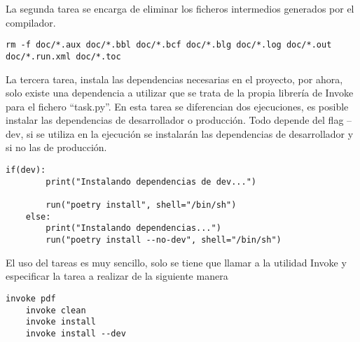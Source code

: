 La segunda tarea se encarga de eliminar los ficheros intermedios generados por el compilador.
\begin{lstlisting}[style=consola]
	rm -f doc/*.aux doc/*.bbl doc/*.bcf doc/*.blg doc/*.log doc/*.out doc/*.run.xml doc/*.toc
\end{lstlisting}

La tercera tarea, instala las \glspl{dependencia} necesarias en el proyecto, por ahora, solo existe una \gls{dependencia} a utilizar que se trata de la propia librería de Invoke para el fichero ``task.py''. En esta tarea se diferencian dos ejecuciones, es posible instalar las \glspl{dependencia} de desarrollador o producción. Todo depende del \gls{flag} --dev, si se utiliza en la ejecución se instalarán las \glspl{dependencia} de desarrollador y si no las de producción. 
\begin{lstlisting}[style=consola]
	if(dev):
		print("Instalando dependencias de dev...")
		
		run("poetry install", shell="/bin/sh")
	else:
		print("Instalando dependencias...")
		run("poetry install --no-dev", shell="/bin/sh")
\end{lstlisting}
\newpage
El uso del \gls{tareas} es muy sencillo, solo se tiene que llamar a la utilidad Invoke y especificar la tarea a realizar de la siguiente manera
\begin{lstlisting}[style=consola]
	invoke pdf
	invoke clean
	invoke install
	invoke install --dev
\end{lstlisting}